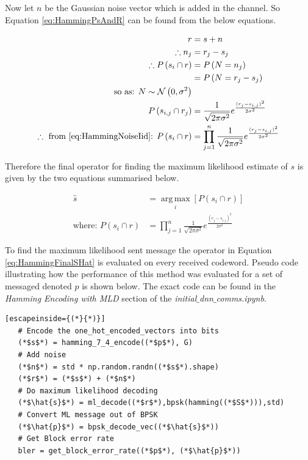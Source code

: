 \documentclass[12pt,onecolumn,letterpaper]{article}
\newcommand{\code}{\textit}
\DeclareMathOperator*{\argmax}{arg\,max}
\begin{document}
Now let $n$ be the Gaussian noise vector which is added in the channel. So Equation \ref{eq:HammingPsAndR} can be found from the below equations.

\begin{align}
   r &= s + n \nonumber\\
   \therefore n_j &= r_j - s_{j} \nonumber\\
   \therefore P\left(s_i\cap r\right) &= P\left(N=n_j\right) \nonumber\\
   &= P\left(N=r_j - s_j\right) \nonumber\\
   \mbox{so as: } N \sim \mathcal{N}\left( 0,\sigma^2\right) \nonumber\\
   P\left(s_{i,j}\cap r_j\right) &= \frac{1}{\sqrt{2\pi\sigma^2}}e^{\frac{(r_j - s_{i,j})^2}{2\sigma^2}} \nonumber\\
   \therefore \mbox{ from \ref{eq:HammingNoiseIid}: }P\left(s_i\cap r\right) &= \prod_{j=1}^{n} \frac{1}{\sqrt{2\pi\sigma^2}}e^{\frac{(r_j - s_{i,j})^2}{2\sigma^2}}
   \label{eq:HammingPsAndR}
\end{align}

Therefore the final operator for finding the maximum likelihood estimate of $s$ is given by the two equations summarised below.

\begin{subequations}
\begin{align}
   \hat{s} &= \underset{i}{\argmax}\left[P\left(s_i\cap r\right)\right] \label{eq:HammingFinalSHat}\\
   \mbox{where: } P\left(s_i\cap r\right) &= \prod_{j=1}^{n} \frac{1}{\sqrt{2\pi\sigma^2}}e^{\frac{(r_j - s_{i,j})^2}{2\sigma^2}}
\end{align}
\end{subequations}

To find the maximum likelihood sent message the operator in Equation \ref{eq:HammingFinalSHat} is evaluated on every received codeword. Pseudo code illustrating how the performance of this method was evaluated for a set of messaged denoted $p$ is shown below. The exact code can be found in the \textit{Hamming Encoding with MLD} section of the \code{initial$\_$dnn$\_$comms.ipynb}.

\begin{lstlisting}[escapeinside={(*}{*)}]
   # Encode the one_hot_encoded_vectors into bits
   (*$s$*) = hamming_7_4_encode((*$p$*), G)   
   # Add noise
   (*$n$*) = std * np.random.randn((*$s$*).shape)
   (*$r$*) = (*$s$*) + (*$n$*)
   # Do maximum likelihood decoding
   (*$\hat{s}$*) = ml_decode((*$r$*),bpsk(hamming((*$S$*))),std)
   # Convert ML message out of BPSK
   (*$\hat{p}$*) = bpsk_decode_vec((*$\hat{s}$*))
   # Get Block error rate
   bler = get_block_error_rate((*$p$*), (*$\hat{p}$*))
\end{lstlisting}
\end{document}
